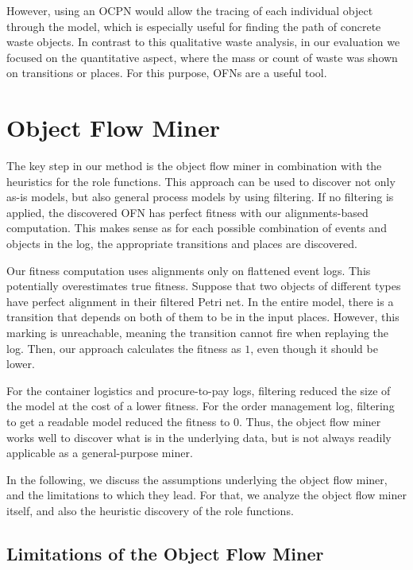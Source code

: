 However, using an OCPN would allow the tracing of each individual object through the model, which is especially useful for finding the path of concrete waste objects.
In contrast to this qualitative waste analysis, in our evaluation we focused on the quantitative aspect, where the mass or count of waste was shown on transitions or places.
For this purpose, OFNs are a useful tool.




\section{Object Flow Miner}



The key step in our method is the object flow miner in combination with the heuristics for the role functions.
This approach can be used to discover not only as-is models, but also general process models by using filtering.
If no filtering is applied, the discovered OFN has perfect fitness with our alignments-based computation.
This makes sense as for each possible combination of events and objects in the log, the appropriate transitions and places are discovered.


Our fitness computation uses alignments only on flattened event logs.
This potentially overestimates true fitness.
Suppose that two objects of different types have perfect alignment in their filtered Petri net.
In the entire model, there is a transition that depends on both of them to be in the input places.
However, this marking is unreachable, meaning the transition cannot fire when replaying the log.
Then, our approach calculates the fitness as $1$, even though it should be lower.




For the container logistics and procure-to-pay logs, filtering reduced the size of the model at the cost of a lower fitness.
For the order management log, filtering to get a readable model reduced the fitness to $0$.
Thus, the object flow miner works well to discover what is in the underlying data, but is not always readily applicable as a general-purpose miner.


In the following, we discuss the assumptions underlying the object flow miner, and the limitations to which they lead.
For that, we analyze the object flow miner itself, and also the heuristic discovery of the role functions.




\subsection{Limitations of the Object Flow Miner}
\label{chap:limitations-object-flow-miner}



